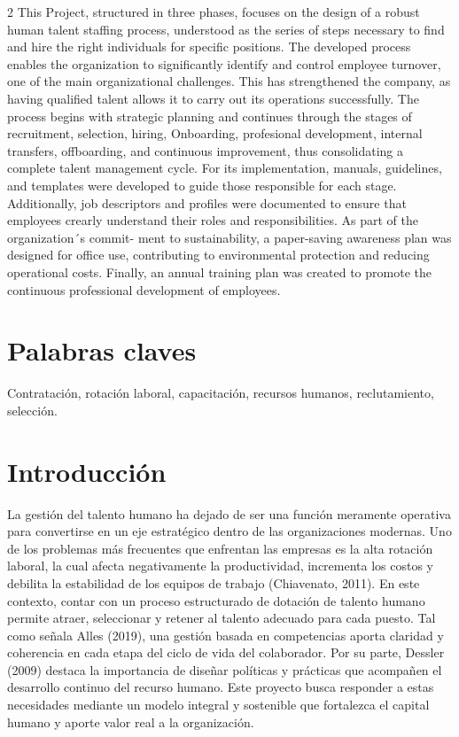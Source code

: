 \documentclass[12pt,spanish,Letterpaper,openany]{book}
\begin{document}
\begin {multicols}{2}
This Project, structured in three phases, focuses on the design of a robust human talent staffing process, understood as the series of steps necessary to find and hire the right individuals for specific positions. The developed process enables the organization to significantly identify and control employee turnover, one of the main organizational challenges. This has strengthened the company, as having qualified talent allows it to carry out its operations successfully. The process begins with strategic planning and continues through the stages of recruitment, selection, hiring, Onboarding, profesional development, internal transfers, offboarding, and continuous improvement, thus consolidating a complete talent management cycle. For its implementation, manuals, guidelines, and templates were developed to guide those responsible for each stage. Additionally, job descriptors and profiles were documented to ensure that employees crearly understand their roles and responsibilities. As part of the organization´s commit-
ment to sustainability, a paper-saving awareness plan was designed for office use, contributing to environmental protection and reducing operational costs. Finally, an annual training plan was created to promote the continuous professional development of employees.

\hypertarget{palabras-claves-4}{%
\section{Palabras claves}\label{palabras-claves-4}}

Contratación, rotación laboral, capacitación, recursos humanos, reclutamiento, selección.

\hypertarget{introducciuxf3n-4}{%
\section{Introducción}\label{introducciuxf3n-4}}

La gestión del talento humano ha dejado de ser una función meramente operativa para convertirse en un eje estratégico dentro de las organizaciones modernas. Uno de los problemas más frecuentes que enfrentan las empresas es la alta rotación laboral, la cual afecta negativamente la productividad, incrementa los costos y debilita la estabilidad de los equipos de trabajo (Chiavenato, 2011). En este contexto, contar con un proceso estructurado de dotación de talento humano permite atraer, seleccionar y retener al talento adecuado para cada puesto. Tal como señala Alles (2019), una gestión basada en competencias aporta claridad y coherencia en cada etapa del ciclo de vida del colaborador. Por su parte, Dessler (2009) destaca la importancia de diseñar políticas y prácticas que acompañen el desarrollo continuo del recurso humano. Este proyecto busca responder a estas necesidades mediante un modelo integral y sostenible que fortalezca el capital humano y aporte valor real a la organización.


\end{multicols}
\end{document}
